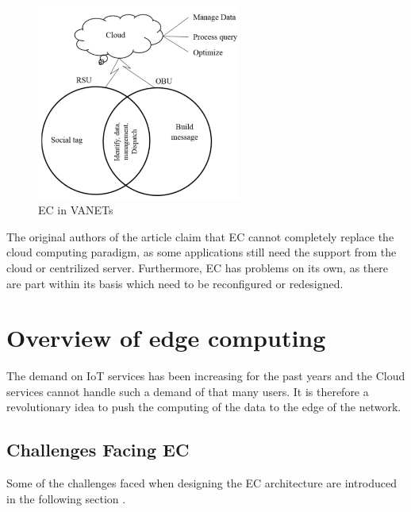 \documentclass[10pt]{article}
\begin{document}
\begin{figure}[h!]
 \centering
  \includegraphics[width=0.6\textwidth]{ecVanet.png}
  \caption{EC in VANETs
   \label{ecvanet}}
\end{figure}

The original authors of the article \cite{artiot} claim that EC cannot
completely replace the cloud computing paradigm, as some applications still need
the support from the cloud or centrilized server. Furthermore, EC has problems
on its own, as there are part within its basis which need to be reconfigured or
redesigned.

\section{Overview of edge computing}

The demand on IoT services has been increasing for the past years and the Cloud
services cannot handle such a demand of that many users. It is therefore a
revolutionary idea to push the computing of the data to the edge of the network.

\subsection{Challenges Facing EC}

Some of the challenges faced when designing the EC architecture are introduced
in the following section \cite{artiot}. 
\end{document}
